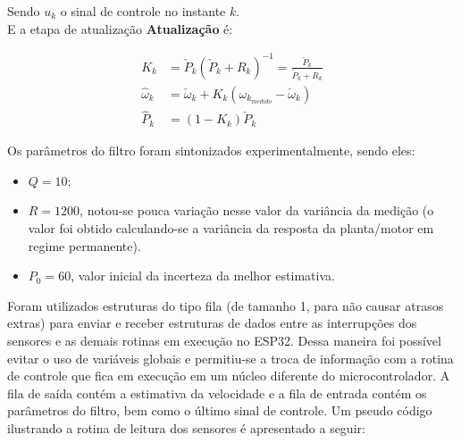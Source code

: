 Sendo $u_k$ o sinal de controle no instante $k$.\\

E a etapa de atualização \textbf{Atualização} é:

\begin{align*}
K_k &= \check{P}_k \left( \check{P}_k + R_k \right)^{-1} = \frac{\check{P}_k}{\check{P}_k + R_k}\\
\hat{\omega}_k &= \check{\omega}_k + K_k \left( \omega_{k_{medido}} - \check{\omega}_k \right)\\
\hat{P}_k &= \left( 1 - K_k \right) \check{P}_k
\end{align*}

Os parâmetros do filtro foram sintonizados experimentalmente, sendo eles:

\begin{itemize}
    \item $Q = 10$;
    \item $R = 1200$, notou-se pouca variação nesse valor da variância da medição (o valor foi obtido calculando-se a variância da resposta da planta/motor em regime permanente).
    \item $P_0 = 60$, valor inicial da incerteza da melhor estimativa.
\end{itemize}

Foram utilizados estruturas do tipo fila (de tamanho 1, para não causar atrasos extras) para enviar e receber estruturas de dados entre as interrupções dos sensores e as demais rotinas em execução no ESP32. Dessa maneira foi possível evitar o uso de variáveis globais e permitiu-se a troca de informação com a rotina de controle que fica em execução em um núcleo diferente do microcontrolador. A fila de saída contém a estimativa da velocidade e a fila de entrada contém os parâmetros do filtro, bem como o último sinal de controle. Um pseudo código ilustrando a rotina de leitura dos sensores é apresentado a seguir:

